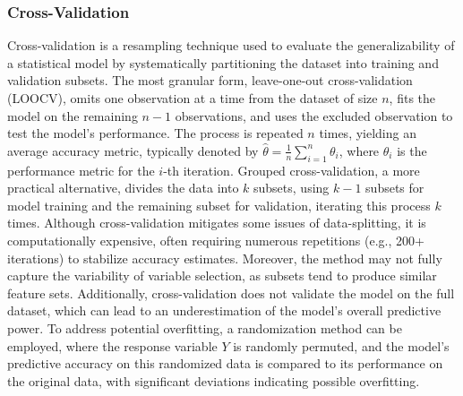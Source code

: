 \subsubsection*{Cross-Validation}
\parencite{harrell__regression_2015} Cross-validation is a resampling technique used to evaluate the generalizability of a statistical model by systematically partitioning the dataset into training and validation subsets. The most granular form, leave-one-out cross-validation (LOOCV), omits one observation at a time from the dataset of size $n$, fits the model on the remaining $n-1$ observations, and uses the excluded observation to test the model's performance. The process is repeated $n$ times, yielding an average accuracy metric, typically denoted by $\hat{\theta} = \frac{1}{n} \sum_{i=1}^{n} \theta_i$, where $\theta_i$ is the performance metric for the $i$-th iteration. Grouped cross-validation, a more practical alternative, divides the data into $k$ subsets, using $k-1$ subsets for model training and the remaining subset for validation, iterating this process $k$ times. Although cross-validation mitigates some issues of data-splitting, it is computationally expensive, often requiring numerous repetitions (e.g., 200+ iterations) to stabilize accuracy estimates. Moreover, the method may not fully capture the variability of variable selection, as subsets tend to produce similar feature sets. Additionally, cross-validation does not validate the model on the full dataset, which can lead to an underestimation of the model's overall predictive power. To address potential overfitting, a randomization method can be employed, where the response variable $Y$ is randomly permuted, and the model's predictive accuracy on this randomized data is compared to its performance on the original data, with significant deviations indicating possible overfitting.

